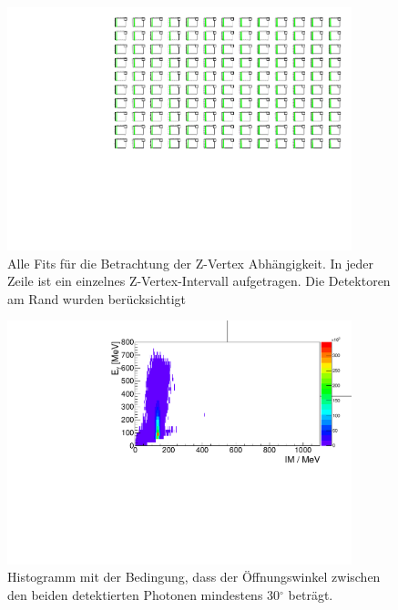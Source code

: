 \documentclass[a4paper,11pt,oneside,final,german,openbib,pdftex]{scrbook}
\begin{document}
{\begin{appendix}
\begin{figure}[h!]
	\begin{center}
		\includegraphics[width=100mm]{NewCalib/20171904ZVertexAllFits}
		\caption[Simulation: Z-Vertex alle Fits]{Alle Fits f\"ur die Betrachtung der Z-Vertex Abh\"angigkeit. In jeder Zeile ist ein einzelnes Z-Vertex-Intervall aufgetragen. Die Detektoren am Rand wurden ber\"ucksichtigt}
		\label{fig:ZVertex-All-Fits}
	\end{center}
\end{figure}

\begin{figure}[h!]
	\begin{center}
		\includegraphics[width=100mm]{NewCalib/20171904SimMinOpeningAngleHist}
		\caption[Simulation: 2D-Hist \"Offnungswinkel $>$ 30$^{\circ}$]{Histogramm mit der Bedingung, dass der \"Offnungswinkel zwischen den beiden detektierten Photonen mindestens 30$^\circ$ betr\"agt.}
	\end{center}
\end{figure}


\end{appendix}}
\end{document}
